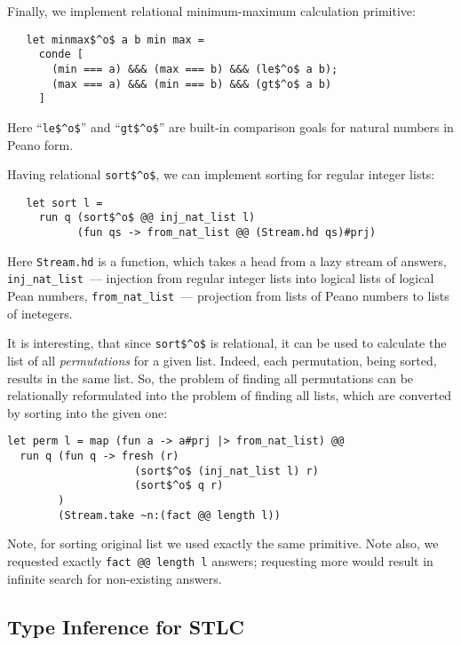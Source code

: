 Finally, we implement relational minimum-maximum calculation
primitive:

\begin{lstlisting}
   let minmax$^o$ a b min max = 
     conde [
       (min === a) &&& (max === b) &&& (le$^o$ a b);
       (max === a) &&& (min === b) &&& (gt$^o$ a b)
     ]
\end{lstlisting}

Here ``\lstinline{le$^o$}'' and ``\lstinline{gt$^o$}'' are built-in comparison goals for natural numbers in Peano form.

Having relational \lstinline{sort$^o$}, we can implement sorting for regular integer lists:

\begin{lstlisting}
   let sort l =
     run q (sort$^o$ @@ inj_nat_list l)
           (fun qs -> from_nat_list @@ (Stream.hd qs)#prj)
\end{lstlisting}

Here \lstinline{Stream.hd} is a function, which takes a head from a lazy stream of answers, 
\lstinline{inj_nat_list}~--- injection from regular integer lists into logical lists of logical Pean numbers, 
\lstinline{from_nat_list}~--- projection from lists of Peano numbers to lists of inetegers.

It is interesting, that since \lstinline{sort$^o$} is
relational, it can be used to calculate the list of all \emph{permutations}
for a given list. Indeed, each permutation, being sorted, results in the same list. 
So, the problem of finding all permutations can be relationally reformulated into 
the problem of finding all lists, which are converted by sorting into the given one:

\begin{lstlisting}
let perm l = map (fun a -> a#prj |> from_nat_list) @@
  run q (fun q -> fresh (r)
                    (sort$^o$ (inj_nat_list l) r) 
                    (sort$^o$ q r)
        )
        (Stream.take ~n:(fact @@ length l))
\end{lstlisting}

Note, for sorting original list we used exactly the same primitive. Note also, 
we requested exactly \lstinline{fact @@ length l} answers; requesting more
would result in infinite search for non-existing answers. 

\subsection{Type Inference for STLC}

